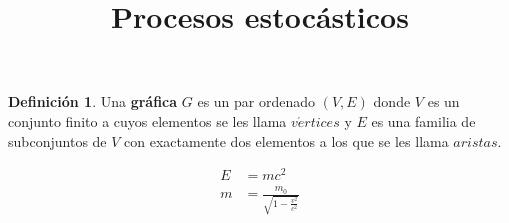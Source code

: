 \documentclass[12pt]{article}
\title{Procesos estocásticos}
\date{}
\theoremstyle{plain}
\theoremstyle{definition}
\newtheorem{definicion}[teorema]{\;\;\;Definici\'on}
\begin{document}
  \maketitle 

 \begin{definicion}
  \label{}
  Una \textbf{gr\'afica} $G$ es un par ordenado $(V,E)$ donde $V$ es un conjunto
  finito a cuyos elementos se les llama $v\acute ertices$ y $E$ es una familia de
  subconjuntos de $V$ con exactamente dos elementos a los que se les llama $aristas$. 
\end{definicion}
  \begin{align}
    E &= mc^2                              \\
    m &= \frac{m_0}{\sqrt{1-\frac{v^2}{c^2}}}
  \end{align}
\end{document}
